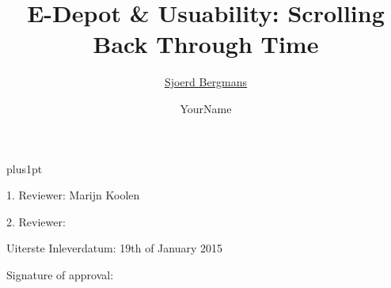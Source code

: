 \documentclass[twoside,11pt]{Latex/Classes/PhDthesisPSnPDF}
\title{E-Depot \& Usuability: Scrolling Back Through Time}
\author{\href{mailto:sbergmans@gmail.com}{Sjoerd Bergmans}}
\author{YourName}
\begin{document}

\renewcommand\baselinestretch{1.2}
\baselineskip=18pt plus1pt



\maketitle  %



\newpage
\vspace{10mm}
1. Reviewer: Marijn Koolen

\vspace{10mm}
2. Reviewer: 

\vspace{20mm}
Uiterste Inleverdatum:  19th of January 2015

\vspace{20mm}
\hspace{70mm}Signature of approval:







%   



\frontmatter





\renewcommand{\contentsname}{Conceptual setup}
\setcounter{secnumdepth}{3} %
\setcounter{tocdepth}{3}    %
\tableofcontents            %
\end{document}
